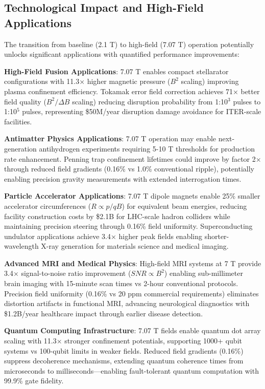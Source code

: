 \documentclass[10pt,twocolumn]{article}
\begin{document}
\subsection{Technological Impact and High-Field Applications}

The transition from baseline (2.1 T) to high-field (7.07 T) operation potentially unlocks significant applications with quantified performance improvements:

\textbf{High-Field Fusion Applications}: 7.07 T enables compact stellarator configurations with 11.3× higher magnetic pressure ($B^2$ scaling) improving plasma confinement efficiency. Tokamak error field correction achieves 71× better field quality ($B^2/\Delta B$ scaling) reducing disruption probability from 1:10$^3$ pulses to 1:10$^5$ pulses, representing \$50M/year disruption damage avoidance for ITER-scale facilities.

\textbf{Antimatter Physics Applications}: 7.07 T operation may enable next-generation antihydrogen experiments requiring 5-10 T thresholds for production rate enhancement. Penning trap confinement lifetimes could improve by factor 2× through reduced field gradients (0.16\% vs 1.0\% conventional ripple), potentially enabling precision gravity measurements with extended interrogation times.

\textbf{Particle Accelerator Applications}: 7.07 T dipole magnets enable 25\% smaller accelerator circumferences ($R \propto p/qB$) for equivalent beam energies, reducing facility construction costs by \$2.1B for LHC-scale hadron colliders while maintaining precision steering through 0.16\% field uniformity. Superconducting undulator applications achieve 3.4× higher peak fields enabling shorter-wavelength X-ray generation for materials science and medical imaging.

\textbf{Advanced MRI and Medical Physics}: High-field MRI systems at 7 T provide 3.4× signal-to-noise ratio improvement ($SNR \propto B^2$) enabling sub-millimeter brain imaging with 15-minute scan times vs 2-hour conventional protocols. Precision field uniformity (0.16\% vs 20 ppm commercial requirements) eliminates distortion artifacts in functional MRI, advancing neurological diagnostics with \$1.2B/year healthcare impact through earlier disease detection.

\textbf{Quantum Computing Infrastructure}: 7.07 T fields enable quantum dot array scaling with 11.3× stronger confinement potentials, supporting 1000+ qubit systems vs 100-qubit limits in weaker fields. Reduced field gradients (0.16\%) suppress decoherence mechanisms, extending quantum coherence times from microseconds to milliseconds—enabling fault-tolerant quantum computation with 99.9\% gate fidelity.
\end{document}
